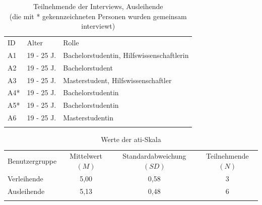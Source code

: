 \begin{table}[h]
        \centering
        \caption{Teilnehmende der Interviews, Ausleihende \\
        (die mit * gekennzeichneten Personen wurden gemeinsam interviewt)}
        \begin{tabular}{lll}
                \arrayrulecolor{maincolor}\hline
                \sffamily\color{maincolor}ID & \sffamily\color{maincolor}Alter &
                \sffamily\color{maincolor}Rolle \\
                \arrayrulecolor{maincolor}\hline
                A1                           & 19 - 25 J.                      & Bachelorstudentin,
                Hilfswissenschaftlerin \\
                A2                           & 19 - 25 J.                      & Bachelorstudent
                \\
                A3                           & 19 - 25 J.                      & Masterstudent,
                Hilfswissenschaftler \\
                A4*                          & 19 - 25 J.                      & Bachelorstudentin
                \\
                A5*                          & 19 - 25 J.                      & Bachelorstudentin
                \\
                A6                           & 19 - 25 J.                      & Masterstudentin
                \\
                \arrayrulecolor{maincolor}\hline 
        \end{tabular}
        \label{table:a}
\end{table}


\begin{table}[h]
        \centering
        \caption{Werte der \ac{ati}-Skala}
        \begin{tabular}{lccc}
                \arrayrulecolor{maincolor}\hline
                \sffamily\color{maincolor}Benutzergruppe & \sffamily\color{maincolor}Mittelwert
                $(M)$ & \sffamily\color{maincolor}Standardabweichung $(SD)$ &
                \sffamily\color{maincolor}Teilnehmende $(N)$ \\
                \arrayrulecolor{maincolor}\hline
                Verleihende                              & 5,00 & 0,58
                                                         & 3 \\
                Ausleihende                              & 5,13 & 0,48
                                                         & 6 \\
                \arrayrulecolor{maincolor}\hline
        \end{tabular}
        \label{table:ati}
\end{table}

